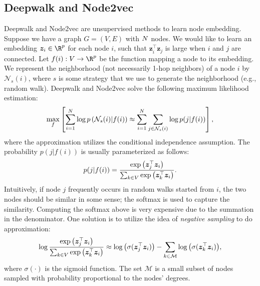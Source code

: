     
\subsection{Deepwalk and Node2vec}
    Deepwalk and Node2vec are unsupervised methods to learn node embedding.
    Suppose we have a graph $G=(V, E)$ with $N$ nodes.
    We would like to learn an embedding $\bm{z}_i \in \R^\nfeat$ for each node $i$, such that $\bm{z}^{\top}_i \bm{z}_j$ is large when $i$ and $j$ are connected.
    Let $f(i): V \rightarrow \R^\nfeat$ be the function mapping a node to its embedding.
    We represent the neighborhood (not necessarily 1-hop neighbors) of a node $i$ by $\mathcal{N}_{s}(i)$, where $s$ is some strategy that we use to generate the neighborhood (e.g., random walk).
    Deepwalk and Node2vec solve the following maximum likelihood estimation:
        \begin{equation}
            \max_{f} \left[ \sum_{i=1}^{N}{ \log p\left(\mathcal{N}_s(i) | f(i) \right)} \approx \sum_{i=1}^{N}{ \sum_{j \in \mathcal{N}_s(i)}^{}{\log p(j | f(i))} } \right],
        \end{equation}
    where the approximation utilizes the conditional independence assumption.
    The probability $p(j | f(i))$ is usually parameterized as follows:
        \begin{equation}
            p(j | f(i)) = \frac{ \text{exp}\left( \bm{z}_j^\top \bm{z}_i \right) }{\sum_{k\in V}^{}{ \text{exp}\left( \bm{z}_k^\top \bm{z}_i \right) }}.
        \end{equation}
    Intuitively, if node $j$ frequently occurs in random walks started from $i$, the two nodes should be similar in some sense; the softmax is used to capture the similarity.
    Computing the softmax above is very expensive due to the summation in the denominator.
    One solution is to utilize the idea of \emph{negative sampling} to do approximation:
        \begin{equation}
            \log \frac{ \text{exp}\left( \bm{z}_j^\top \bm{z}_i \right) }{\sum_{k\in V}^{}{ \text{exp}\left( \bm{z}_k^\top \bm{z}_i \right) }} \approx \log\left( \sigma(\bm{z}_j^\top \bm{z}_i) \right)  - \sum_{k\in \mathcal{M}}^{}{\log\left( \sigma(\bm{z}_k^\top \bm{z}_i) \right)},
        \end{equation}
    where $\sigma(\cdot)$ is the sigmoid function.
    The set $\mathcal{M}$ is a small subset of nodes sampled with probability proportional to the nodes' degrees. 
    
    

